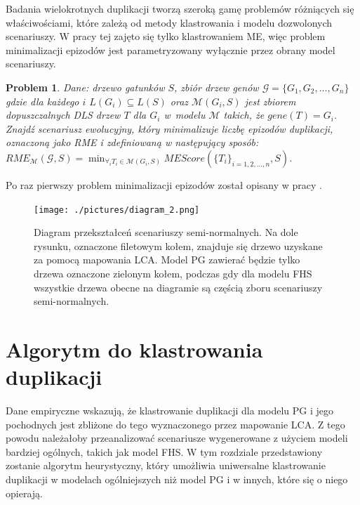 \documentclass[licencjacka]{pracamgr}
\begin{document}
Badania wielokrotnych duplikacji tworzą szeroką gamę problemów różniących się właściwościami, które zależą od metody klastrowania i modelu dozwolonych scenariuszy. W pracy tej zajęto się tylko klastrowaniem ME, więc problem minimalizacji epizodów jest parametryzowany wyłącznie przez obrany model scenariuszy. 

\newtheorem{problem}{Problem}
\begin{problem}
  Dane: drzewo gatunków $S$, zbiór drzew genów $\mathcal{G}=\{G_1,G_2, \dots , G_n\}$ gdzie dla każdego $i$ $L(G_i) \subseteq L(S)$ oraz $\mathcal{M}(G_i,S)$ jest zbiorem dopuszczalnych DLS drzew $T$ dla $G_i$ w~modelu $\mathcal{M}$ takich, że $gene(T)=G_i$. Znajdź scenariusz ewolucyjny, który minimalizuje liczbę epizodów duplikacji, oznaczoną jako RME i zdefiniowaną w następujący sposób:
  ${RME}_{\mathcal{M}}(\mathcal{G}, S) = \min_{\forall_i T_i \in \mathcal{M}(G_i,S)}MEScore(\lbrace T_i \rbrace_{i=1,2,\dots,n},S)$.
\end{problem}

Po raz pierwszy problem minimalizacji epizodów został opisany w pracy \cite{Guigo1996}.

\begin{figure}[t]\label{diagram_red}
  \centering
  \texttt{[image: ./pictures/diagram\_2.png]}
  \caption{Diagram przekształceń scenariuszy semi-normalnych. Na dole rysunku, oznaczone filetowym kołem, znajduje się drzewo uzyskane za pomocą mapowania LCA. Model PG zawierać będzie tylko drzewa oznaczone zielonym kołem, podczas gdy dla modelu FHS wszystkie drzewa obecne na diagramie są częścią zboru scenariuszy semi-normalnych.}
\end{figure}


\chapter{Algorytm do klastrowania duplikacji}\label{r:heurystyka}
Dane empiryczne wskazują, że klastrowanie duplikacji dla modelu PG i jego pochodnych jest zbliżone do tego wyznaczonego przez mapowanie LCA. Z tego powodu należałoby przeanalizować scenariusze wygenerowane z użyciem modeli bardziej ogólnych, takich jak model FHS. W tym rozdziale przedstawiony zostanie algorytm heurystyczny, który umożliwia uniwersalne klastrowanie duplikacji w modelach ogólniejszych niż model PG i w innych, które się o niego opierają.
\end{document}
